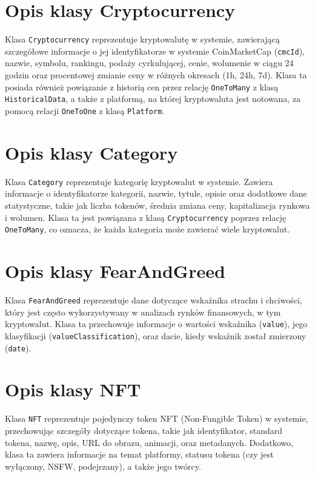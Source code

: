 \section{Opis klasy Cryptocurrency}

Klasa \texttt{Cryptocurrency} reprezentuje kryptowalutę w systemie, zawierającą szczegółowe informacje o jej identyfikatorze w systemie CoinMarketCap (\texttt{cmcId}), nazwie, symbolu, rankingu, podaży cyrkulującej, cenie, wolumenie w ciągu 24 godzin oraz procentowej zmianie ceny w różnych okresach (1h, 24h, 7d). Klasa ta posiada również powiązanie z historią cen przez relację \texttt{OneToMany} z klasą \texttt{HistoricalData}, a także z platformą, na której kryptowaluta jest notowana, za pomocą relacji \texttt{OneToOne} z klasą \texttt{Platform}.

\section{Opis klasy Category}

Klasa \texttt{Category} reprezentuje kategorię kryptowalut w systemie. Zawiera informacje o identyfikatorze kategorii, nazwie, tytule, opisie oraz dodatkowe dane statystyczne, takie jak liczba tokenów, średnia zmiana ceny, kapitalizacja rynkowa i wolumen. Klasa ta jest powiązana z klasą \texttt{Cryptocurrency} poprzez relację \texttt{OneToMany}, co oznacza, że każda kategoria może zawierać wiele kryptowalut. 

\section{Opis klasy FearAndGreed}

Klasa \texttt{FearAndGreed} reprezentuje dane dotyczące wskaźnika strachu i chciwości, który jest często wykorzystywany w analizach rynków finansowych, w tym kryptowalut. Klasa ta przechowuje informacje o wartości wskaźnika (\texttt{value}), jego klasyfikacji (\texttt{valueClassification}), oraz dacie, kiedy wskaźnik został zmierzony (\texttt{date}).

\section{Opis klasy NFT}

Klasa \texttt{NFT} reprezentuje pojedynczy token NFT (Non-Fungible Token) w systemie, przechowując szczegóły dotyczące tokena, takie jak identyfikator, standard tokena, nazwę, opis, URL do obrazu, animacji, oraz metadanych. Dodatkowo, klasa ta zawiera informacje na temat platformy, statusu tokena (czy jest wyłączony, NSFW, podejrzany), a także jego twórcy.

